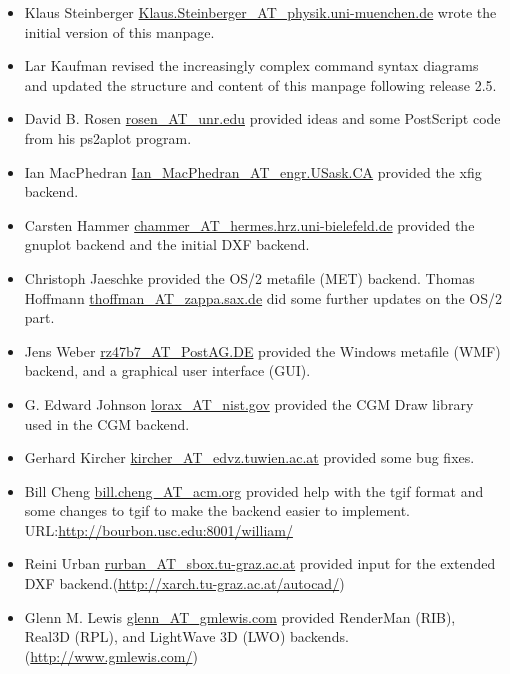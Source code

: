 \documentclass[english,a4paper]{article}
\let\URL\url \let\Email\url \let\File\url
\begin{document}
\begin{itemize}\setlength{\itemsep}{0cm}

  \item Klaus Steinberger \Email{Klaus.Steinberger_AT_physik.uni-muenchen.de}
     wrote the initial version of this manpage.

  \item Lar Kaufman revised the increasingly complex
     command syntax diagrams and updated the structure and content of this
     manpage following release 2.5. 

  \item David B. Rosen \Email{rosen_AT_unr.edu} provided ideas and some PostScript
     code from his ps2aplot program.

  \item Ian MacPhedran \Email{Ian_MacPhedran_AT_engr.USask.CA} provided the xfig
     backend.

  \item Carsten Hammer \Email{chammer_AT_hermes.hrz.uni-bielefeld.de} provided the
     gnuplot backend and the initial DXF backend.

  \item Christoph Jaeschke provided the OS/2 metafile (MET) backend. 
  Thomas Hoffmann \Email{thoffman_AT_zappa.sax.de} did some further updates on the OS/2 part.

  \item Jens Weber \Email{rz47b7_AT_PostAG.DE} provided the Windows metafile (WMF)
     backend, and a graphical user interface (GUI).

  \item G. Edward Johnson \Email{lorax_AT_nist.gov} provided the CGM Draw library
     used in the CGM backend.

  \item Gerhard Kircher \Email{kircher_AT_edvz.tuwien.ac.at} provided some bug
     fixes.

  \item Bill Cheng \Email{bill.cheng_AT_acm.org} provided help with the tgif
     format and some changes to tgif to make the backend easier to implement.
     URL:\URL{http://bourbon.usc.edu:8001/william/}

  \item Reini Urban \Email{rurban_AT_sbox.tu-graz.ac.at} provided input for the
     extended DXF backend.(\URL{http://xarch.tu-graz.ac.at/autocad/})

  \item Glenn M. Lewis \Email{glenn_AT_gmlewis.com} provided RenderMan (RIB),
     Real3D (RPL), and LightWave 3D (LWO) backends.
     (\URL{http://www.gmlewis.com/})


\end{itemize}
\end{document}
